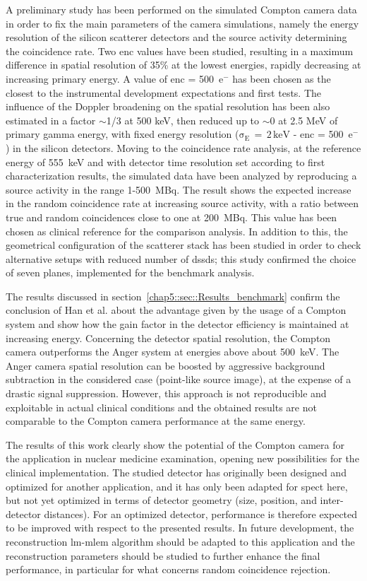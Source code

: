A preliminary study has been performed on the simulated Compton camera data in order to fix the main parameters of the camera simulations, namely the energy resolution of the silicon scatterer detectors and the source activity determining the coincidence rate. Two \gls{enc} values have been studied, resulting in a maximum difference in spatial resolution of 35\% at the lowest energies, rapidly decreasing at increasing primary energy. A value of \gls{enc} = 500~e$^-$ has been chosen as the closest to the instrumental development expectations and first tests. The influence of the Doppler broadening on the spatial resolution has been also estimated in a factor $\sim$1/3 at 500 keV, then reduced up to $\sim$0 at 2.5 MeV of primary gamma energy, with fixed energy resolution ($\mathrm{\sigma_{E}\,=\,2\,keV}$ - \gls{enc} = 500~e$^-$) in the silicon detectors. Moving to the coincidence rate analysis, at the reference energy of 555~keV and with detector time resolution set according to first characterization results, the simulated data have been analyzed by reproducing a source activity in the range 1-500~MBq. The result shows the expected increase in the random coincidence rate at increasing source activity, with a ratio between true and random coincidences close to one at 200~MBq. This value has been chosen as clinical reference for the comparison analysis. In addition to this, the geometrical configuration of the scatterer stack has been studied in order to check alternative setups with reduced number of \glspl{dssd}; this study confirmed the choice of seven planes, implemented for the benchmark analysis. 

The results discussed in section~\ref{chap5::sec::Results_benchmark} confirm the conclusion of Han et al. about the advantage given by the usage of a Compton system and show how the gain factor in the detector efficiency is maintained at increasing energy. Concerning the detector spatial resolution, the Compton camera outperforms the Anger system at energies above about 500~keV. The Anger camera spatial resolution can be boosted by aggressive background subtraction in the considered case (point-like source image), at the expense of a drastic signal suppression. However, this approach is not reproducible and exploitable in actual clinical conditions and the obtained results are not comparable to the Compton camera performance at the same energy.

The results of this work clearly show the potential of the Compton camera for the application in nuclear medicine examination, opening new possibilities for the clinical implementation. The studied detector has originally been designed and optimized for another application, and it has only been adapted for \gls{spect} here, but not yet optimized in terms of detector geometry (size, position, and inter-detector distances). For an optimized detector, performance is therefore expected to be improved with respect to the presented results. In future development, the reconstruction \gls{lm-mlem} algorithm should be adapted to this application and the reconstruction parameters should be studied to further enhance the final performance, in particular for what concerns random coincidence rejection.

